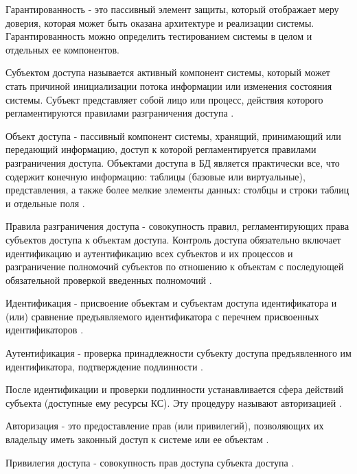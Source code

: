 Гарантированность - это пассивный элемент защиты, который отображает меру доверия, которая может быть оказана архитектуре и реализации системы. Гарантированность можно определить тестированием системы в целом и отдельных ее компонентов.

Субъектом доступа называется активный компонент системы, который может стать причиной инициализации потока информации или изменения состояния системы. Субъект представляет собой лицо или процесс, действия которого регламентируются правилами разграничения доступа \autocite[сс. 15-18]{Skakun}. 

Объект доступа - пассивный компонент системы, хранящий, принимающий или передающий информацию, доступ к которой регламентируется правилами разграничения доступа. Объектами доступа в БД является практически все, что содержит конечную информацию: таблицы (базовые или виртуальные), представления, а также более мелкие элементы данных: столбцы и строки таблиц и отдельные поля \autocite[сс. 15-18]{Skakun}. 

Правила разграничения доступа - совокупность правил, регламентирующих права субъектов доступа к объектам доступа. Контроль доступа обязательно включает идентификацию и аутентификацию всех субъектов и их процессов и разграничение полномочий субъектов по отношению к объектам с последующей обязательной проверкой введенных полномочий \autocite[сс. 15-18]{Skakun}.

Идентификация - присвоение объектам и субъектам доступа идентификатора и (или) сравнение предъявляемого идентификатора с перечнем присвоенных идентификаторов \autocite[сс. 15-18]{Skakun}. 

Аутентификация  - проверка принадлежности субъекту доступа предъявленного им идентификатора, подтверждение подлинности \autocite[сс. 15-18]{Skakun}. 

После идентификации и проверки подлинности устанавливается сфера действий субъекта (доступные ему ресурсы КС). Эту процедуру называют авторизацией \autocite[сс. 15-18]{Skakun}.

Авторизация - это предоставление прав (или привилегий), позволяющих их владельцу иметь законный доступ к системе или ее объектам \autocite[сс. 15-18]{Skakun}. 

Привилегия доступа - совокупность прав доступа субъекта доступа \autocite[сс. 15-18]{Skakun}. 

